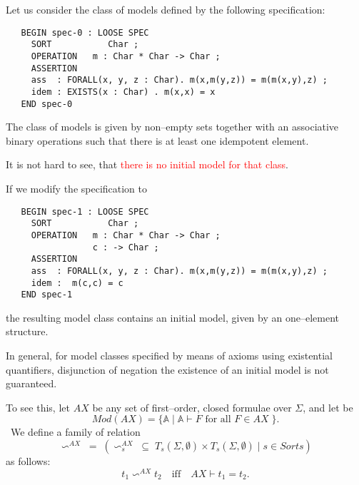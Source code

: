 \documentclass[landscape, autoslides, light]{mmiss}
\begin{document}
\begin{Package}[Label={FSDPT}, Title={Formal Specification of Data and Process Types}, ShortTitle={FSDPT}, Authors={Horst Reichel}, Date={February 2003}, LevelOfDetail=Lecture, Language=en-GB]
\begin{Section}[Title={Initial Algebras as Data Types}, Label={section3}]
\begin{Section}[Title={Existence of initial models}, Label={section3_1}]
\begin{Paragraph}[Title={Minimal Herbrand Model}, Label=Paragraph28]
\end{Paragraph}
\begin{Paragraph}[Label=Paragraph29]
\small Let us consider the class of models defined by the
following specification:\\ \pause
\begin{verbatim}
   BEGIN spec-0 : LOOSE SPEC
     SORT           Char ;
     OPERATION   m : Char * Char -> Char ;
     ASSERTION
     ass  : FORALL(x, y, z : Char). m(x,m(y,z)) = m(m(x,y),z) ;
     idem : EXISTS(x : Char) . m(x,x) = x
   END spec-0
\end{verbatim}\pause

 The class of models is given by  non--empty sets together
with an associative binary operations such that there is at least
one idempotent element.\pause

It is not hard to see, that \textcolor{red}{there is no initial
model for that class}.


\end{Paragraph}
\begin{Paragraph}[Label=Paragraph30]

If we modify the specification to
\begin{verbatim}
   BEGIN spec-1 : LOOSE SPEC
     SORT           Char ;
     OPERATION   m : Char * Char -> Char ;
                 c : -> Char ;
     ASSERTION
     ass  : FORALL(x, y, z : Char). m(x,m(y,z)) = m(m(x,y),z) ;
     idem :  m(c,c) = c
   END spec-1
\end{verbatim}
the resulting model class contains an initial model, given by an
one--element structure.


\end{Paragraph}
\begin{Paragraph}[Label=Paragraph31]

 In general, for model classes specified by means of axioms
using existential quantifiers, disjunction of negation the
existence of an initial model is not guaranteed.\pause

To see this, let $AX$ be any set of first--order, closed formulae
over $\Sigma$, and let be
$$Mod(AX) = \{ \mathbb{A} \; | \; \mathbb{A}
\vdash F \mbox{ for all } F \in AX \; \}.$$
\
We define a family of relation $$\backsim^{AX} \; = \; (
\backsim_s^{AX} \; \subseteq \; T_s(\Sigma, \emptyset) \times
T_s(\Sigma, \emptyset) \; | \; s \in Sorts )$$ as follows:
$$ t_1 \backsim^{AX} t_2 \quad \mbox{iff} \quad AX \vdash t_1 = t_2 .
$$


\end{Paragraph}
\end{Section}
\end{Section}
\end{Package}
\end{document}
